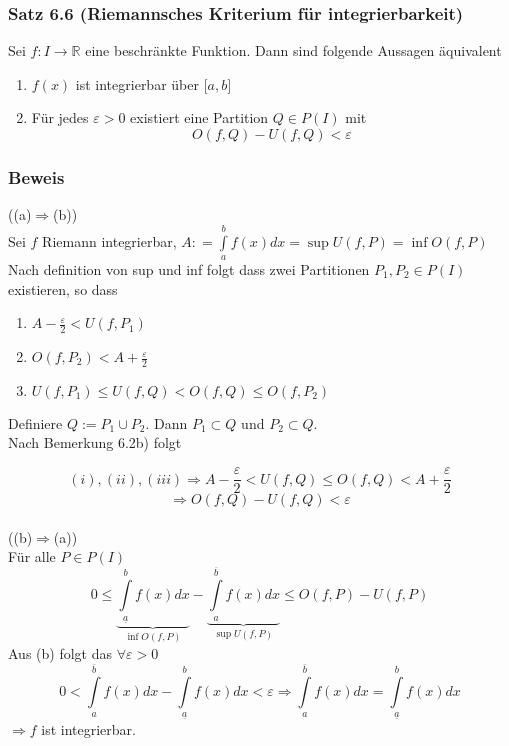 \subsubsection*{Satz 6.6 (Riemannsches Kriterium für integrierbarkeit)}
Sei $f:I\rightarrow\mathbb{R}$ eine beschränkte Funktion. Dann sind folgende Aussagen äquivalent
\begin{enumerate}
\item $f(x)$ ist integrierbar über $\lbrack a,b\rbrack$
\item Für jedes $\varepsilon>0$ existiert eine Partition $Q\in P(I)$ mit $$O(f,Q)-U(f,Q)<\varepsilon$$
\end{enumerate}
\subsubsection*{Beweis}
((a)$\Rightarrow$(b))\\
Sei $f$ Riemann integrierbar, $A: = \int\limits_a^b {f(x)dx = \sup U(f,P) = \inf O(f,P)}$\\
Nach definition von sup und inf folgt dass zwei Partitionen $P_1,P_2\in P(I)$ existieren, so dass 

\begin{enumerate}[\indent $(i)$]
\item $A-\frac{\varepsilon}{2}<U(f,P_1)$
\item $O(f,P_2)<A+\frac{\varepsilon}{2}$
\item $U(f,P_1) \leq U(f,Q) < O(f,Q) \leq O(f,P_2)$ 
\end{enumerate} 




Definiere $Q:=P_1\cup P_2$. Dann $P_1\subset Q$ und $P_2 \subset Q$.\\
Nach Bemerkung 6.2b) folgt

$$(i),(ii),(iii) \Rightarrow A-\frac{\varepsilon}{2}<U(f,Q)\leq O(f,Q)<A+\frac{\varepsilon}{2}$$
$$\Rightarrow O(f,Q)-U(f,Q) < \varepsilon$$\\

\noindent((b)$\Rightarrow$(a))\\
Für alle $P\in P(I)$ \[0 \le \underbrace {\int\limits_{\underline{a}}^b {f(x)dx} }_{\inf O(f,P)} - \underbrace {\int\limits_a^{\overline{b}} {f(x)dx} }_{\sup U(f,P)} \le O(f,P) - U(f,P)\]
Aus (b) folgt das $\forall\varepsilon>0$ $$0 < \int\limits_a^{\overline{b}} {f(x)dx - \int\limits_{\underline{a}}^b {f(x)dx < \varepsilon } } \Rightarrow \int\limits_a^{\overline{b}} {f(x)dx = \int\limits_{\underline{a}}^b {f(x)dx} } $$ $\Rightarrow f$ ist integrierbar.

